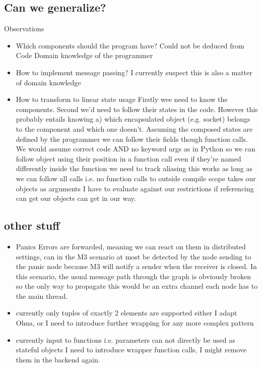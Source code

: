 \subsection{Can we generalize?}
Observations
\begin{itemize}
    \item Which components should the program have? \means Could not be deduced from Code \means Domain knowledge of the programmer
    \item How to implement message passing? \means I currently suspect this is also a matter of domain knowledge 
    \item How to transform to linear state usage \means Firstly wee need to know the components. Second we'd need to follow their states in the code. However this probably entails knowing a) which encapsulated object (e.g. socket) belongs to the component and which one doesn't. Assuming the composed states are defined by the programmer we can follow their fields though function calls. We would assume correct code AND no keyword args as in Python so we can follow object using their position in a function call even if they're named differently inside the function \means we need to track aliasing \means this works as long as we can follow all calls i.e. no function calls to outside compile scope takes our objects as arguments \means I have to evaluate against our restrictions if referencing can get our objects can get in our way.
\end{itemize}


\subsection{other stuff}
\begin{itemize}
    \item Panics \means Errors are forwarded, meaning we can react on them in distributed settings,  can in the M3 scenario at most be detected by the node sending to the panic node because M3 will notify a sender when the receiver is closed. In this scenario, the usual message path through the graph is obviously broken so the only way to propagate this would be an extra channel each node has to the main thread.
    \item currently only tuples of exactly 2 elements are supported \means either I adapt Ohua, or I need to introduce further wrapping for any more complex pattern
    \item currently input to functions i.e. parameters can not directly be used as stateful objects \means I need to introduce wrapper function calls, I might remove them in the backend again.
\end{itemize}

